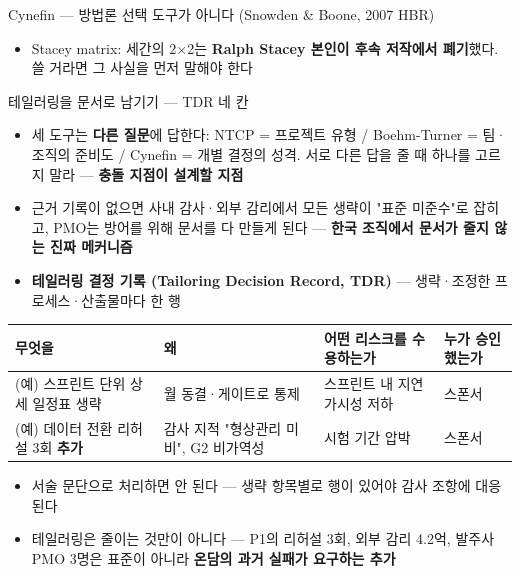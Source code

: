 \begin{frame}[allowframebreaks=1.0]{Cynefin — 방법론 선택 도구가 아니다 (Snowden \& Boone, 2007 HBR)}
\begin{itemize}
\item\relax Stacey matrix: 세간의 2$\times$2는 \textbf{Ralph Stacey 본인이 후속 저작에서 폐기}했다. 쓸 거라면 그 사실을 먼저 말해야 한다
\end{itemize}
\end{frame}

\begin{frame}[allowframebreaks=1.0]{테일러링을 문서로 남기기 — TDR 네 칸}
\small
\begin{itemize}
\item\relax 세 도구는 \textbf{다른 질문}에 답한다: NTCP = 프로젝트 유형 / Boehm-Turner = 팀·조직의 준비도 / Cynefin = 개별 결정의 성격. 서로 다른 답을 줄 때 하나를 고르지 말라 — \textbf{충돌 지점이 설계할 지점}
\item\relax 근거 기록이 없으면 사내 감사·외부 감리에서 모든 생략이 "표준 미준수"로 잡히고, PMO는 방어를 위해 문서를 다 만들게 된다 — \textbf{한국 조직에서 문서가 줄지 않는 진짜 메커니즘}
\item\relax \textbf{테일러링 결정 기록 (Tailoring Decision Record, TDR)} — 생략·조정한 프로세스·산출물마다 한 행
\end{itemize}
{\small\setlength{\tabcolsep}{3pt}\renewcommand{\arraystretch}{1.12}
\begin{tabular}{@{}>{\raggedright\arraybackslash}p{}>{\raggedright\arraybackslash}p{}>{\raggedright\arraybackslash}p{}>{\raggedright\arraybackslash}p{}@{}}
\toprule
\textbf{무엇을} & \textbf{왜} & \textbf{어떤 리스크를 수용하는가} & \textbf{누가 승인했는가} \\
\midrule
(예) 스프린트 단위 상세 일정표 생략 & 월 동결·게이트로 통제 & 스프린트 내 지연 가시성 저하 & 스폰서 \\
(예) 데이터 전환 리허설 3회 \textbf{추가} & 2023 감사 지적 "형상관리 미비", G2 비가역성 & 시험 기간 압박 & 스폰서 \\
\bottomrule
\end{tabular}}
\par\smallskip
\begin{itemize}
\item\relax 서술 문단으로 처리하면 안 된다 — 생략 항목별로 행이 있어야 감사 조항에 대응된다
\item\relax 테일러링은 줄이는 것만이 아니다 — P1의 리허설 3회, 외부 감리 4.2억, 발주사 PMO 3명은 표준이 아니라 \textbf{온담의 과거 실패가 요구하는 추가}
\end{itemize}
\end{frame}

